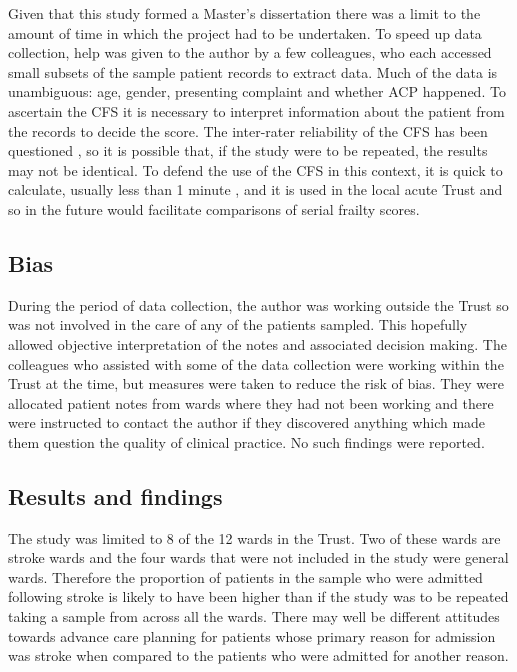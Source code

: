 \documentclass
[
	12pt,
	a4paper,
	oneside,
]{report}
\begin{document}
Given that this study formed a Master's dissertation there was a limit to the
amount of time in which the project had to be undertaken. To speed up data 
collection, help was given to the author by a few
colleagues, who each accessed small subsets of the sample patient records to 
extract data. Much of the data is unambiguous: age, gender, presenting complaint
and whether ACP happened. To ascertain the CFS it is necessary to interpret 
information about the patient from the records to decide the score. The
inter-rater reliability of the CFS has been questioned \parencite{gilbert:18},
so it is possible that, 
if the study were to be repeated, the results may not be identical.
To defend the use of the CFS in this context, it is quick to calculate, usually 
less than 1 minute \parencite{elliott:17}, and it is used in the local acute
Trust and so in the future would facilitate comparisons of serial frailty
scores.

\subsection{Bias} 
During the period of data collection, the author was working outside the Trust 
so was not involved in the care of any of the patients sampled. This hopefully 
allowed objective interpretation of the notes and associated decision making.
The colleagues who assisted with some of the data collection were working 
within the Trust at the time, but measures were taken to reduce the risk of 
bias. They were allocated patient notes from wards where they had not been
working and there were instructed to contact the author if they discovered
anything which made them question the quality of clinical practice. No such
findings were reported.

\subsection{Results and findings}

The study was limited to 8 of the 12 wards in the Trust. Two of these wards
are stroke wards and the four wards that were not included in the study were 
general wards. Therefore the proportion of patients in the sample
who were admitted following stroke is likely to have been higher than if the 
study was to be repeated taking a sample from across all the wards. There may 
well be different attitudes towards advance care planning for patients whose
primary reason for admission was stroke when compared to the patients who
were admitted for another reason.
\end{document}

